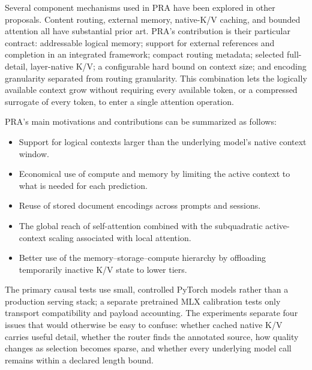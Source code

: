 \documentclass[11pt]{article}
\begin{document}
Several component mechanisms used in PRA have been explored in other proposals. Content
routing, external memory, native-K/V caching, and bounded attention all have substantial
prior art. PRA's contribution is their particular contract: addressable logical memory;
support for external references and completion in an integrated framework; compact
routing metadata; selected full-detail, layer-native K/V; a configurable hard bound on
context size; and encoding granularity separated from routing granularity. This
combination lets the logically available context grow without requiring every available
token, or a compressed surrogate of every token, to enter a single attention operation.

PRA's main motivations and contributions can be summarized as follows:

\begin{itemize}
  \item Support for logical contexts larger than the underlying model's native context window.
  \item Economical use of compute and memory by limiting the active context to what is
  needed for each prediction.
  \item Reuse of stored document encodings across prompts and sessions.
  \item The global reach of self-attention combined with the subquadratic active-context
  scaling associated with local attention.
  \item Better use of the memory--storage--compute hierarchy by offloading temporarily
  inactive K/V state to lower tiers.
\end{itemize}


The primary causal tests use small, controlled PyTorch models rather than a production
serving stack; a separate pretrained MLX calibration tests only transport compatibility
and payload accounting. The experiments separate four issues that would otherwise be
easy to confuse: whether cached native K/V carries useful detail,
whether the router finds the annotated source, how quality changes as selection becomes
sparse, and whether every underlying model call remains within a declared length bound.
\end{document}
